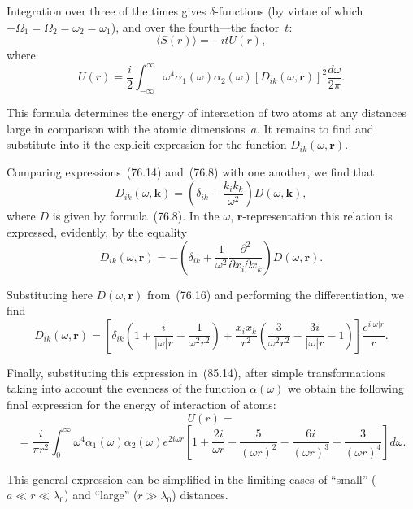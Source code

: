 Integration over three of the times gives $\delta$-functions (by virtue of which $-\Omega_1 = \Omega_2 = \omega_2 = \omega_1$), and over the fourth---the factor~$t$:
\[
\langle S(r)\rangle = -itU(r),
\]
where
\begin{equation}
U(r) = \frac{i}{2}\int_{-\infty}^{\infty}\omega^4\alpha_1(\omega)\alpha_2(\omega)[D_{ik}(\omega,\mathbf{r})]^2\frac{d\omega}{2\pi}.
\tag{85.14}
\end{equation}

This formula determines the energy of interaction of two atoms at any distances large in comparison with the atomic dimensions~$a$. It remains to find and substitute into it the explicit expression for the function $D_{ik}(\omega, \mathbf{r})$.

Comparing expressions~(76.14) and~(76.8) with one another, we find that
\[
D_{ik}(\omega, \mathbf{k}) = \left(\delta_{ik} - \frac{k_ik_k}{\omega^2}\right)D(\omega, \mathbf{k}),
\]
where $D$ is given by formula~(76.8). In the $\omega$, $\mathbf{r}$-representation this relation is expressed, evidently, by the equality
\begin{equation}
D_{ik}(\omega, \mathbf{r}) = -\left(\delta_{ik} + \frac{1}{\omega^2}\frac{\partial^2}{\partial x_i\partial x_k}\right)D(\omega, \mathbf{r}).
\tag{85.15}
\end{equation}

Substituting here $D(\omega, \mathbf{r})$ from~(76.16) and performing the differentiation, we find
\begin{equation}
D_{ik}(\omega, \mathbf{r}) = \left[\delta_{ik}\left(1+\frac{i}{|\omega|r}-\frac{1}{\omega^2r^2}\right)+\frac{x_ix_k}{r^2}\left(\frac{3}{\omega^2r^2}-\frac{3i}{|\omega|r}-1\right)\right]\frac{e^{i|\omega|r}}{r}.
\tag{85.16}
\end{equation}

Finally, substituting this expression in~(85.14), after simple transformations taking into account the evenness of the function $\alpha(\omega)$ we obtain the following final expression for the energy of interaction of atoms:
\[
U(r) =
\]
\begin{equation}
= \frac{i}{\pi r^2}\int_0^\infty\omega^4\alpha_1(\omega)\alpha_2(\omega)e^{2i\omega r}\left[1+\frac{2i}{\omega r}-\frac{5}{(\omega r)^2}-\frac{6i}{(\omega r)^3}+\frac{3}{(\omega r)^4}\right]d\omega.
\tag{85.17}
\end{equation}

This general expression can be simplified in the limiting cases of ``small'' ($a \ll r \ll \lambda_0$) and ``large'' ($r \gg \lambda_0$) distances.

